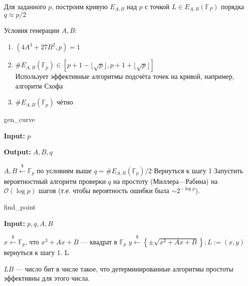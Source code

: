 \documentclass[12pt]{article}
\newcommand{\F}{{{\mathbb F}}}
\newcommand{\bigO}{\mathcal{O}}
\theoremstyle{definition}
\theoremstyle{definition}
\theoremstyle{definition}
\begin{document}
Для заданного $p$, построим кривую $E_{A,B}$ над $p$ с точкой $L \in E_{A,B}(\F_P)$ порядка $q \approx p/2$

Условия генерации $A, B$:
\begin{enumerate}[label=\alph*)]
    \item $(4A^3 + 27B^2, p) = 1$
    \item $\#E_{A,B}(\F_p) \in \left[ p+1 - \lfloor\sqrt{p}\rfloor, p + 1 + \lfloor\sqrt{p}\rfloor \right]$\\
    Использует эффективные алгоритмы подсчёта точек на кривой, например, алгоритм Схофа
    \item $\#E_{A,B}(\F_p)$ чётно
\end{enumerate}

\begin{algorithm}[H]
	\caption{gen\_curve}
	\label{alg:GenCurveP}
    \textbf{Input:} $p$
    
    \textbf{Output:} $A,B,q$

	\begin{algorithmic}[1]
		
		\State $A, B \xleftarrow{\$} \F_p$ по условиям выше
		\State $q = \#E_{A,B}(\F_p) / 2$
		    \State Вернуться к шагу 1  
	    \EndIf
	    \State Запустить вероятностный алгоритм проверки $q$ на простоту (Миллера—Рабина) на $\bigO(\log p)$ шагов (т.е. чтобы вероятность ошибки была $\sim 2^{-\log p}$).
	\end{algorithmic}
\end{algorithm}

\begin{algorithm}[H]
	\caption{find\_point}
	\label{alg:Find_point}
    \textbf{Input:} $p, q, A, B$

	\begin{algorithmic}[1]
		\State $x \xleftarrow{\$} \F_p$, что $x^3+Ax+B$ — квадрат в $\F_p$
		\State $y \xleftarrow{\$} \left\{ \pm \sqrt{x^3 + Ax+B} \right\}; L:=(x,y)$
		\If{$q \cdot L \neq \bigO$}
		    \State вернуться к шагу 1.
		\EndIf
		\State \Return L
	\end{algorithmic}
\end{algorithm}

$LB$ — число бит в числе такое, что детерминированные алгоритмы простоты эффективны для этого числа.
\end{document}
